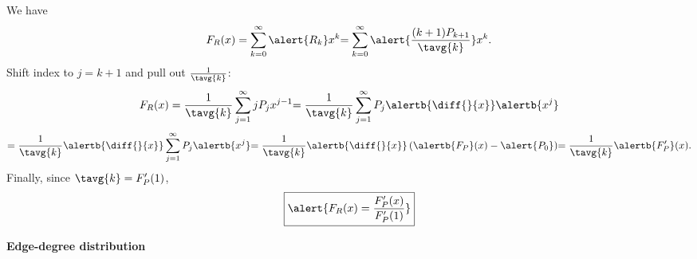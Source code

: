 \begin{frame}[label=]
\begin{frame}[label=]
\begin{frame}[label=]
\begin{frame}[label=]
\begin{frame}[label=]
\begin{frame}[label=]
\begin{frame}[label=]
    We have 
    $$
    F_R(x)
    =
    \sum_{k=0}^{\infty}
    \alert{R_k}
    x^k
    {
      =
      \sum_{k=0}^{\infty}
      \alert{
      \frac{(k+1)P_{k+1}}
      {\tavg{k}}
      }
      x^k.
    }
    $$
    {
      Shift index to $j=k+1$ and pull out $\frac{1}{\tavg{k}}$:
    }
    $$
    {
      F_R(x)
      =
      \frac{1}{\tavg{k}}
      \sum_{j=1}^{\infty}
      j P_{j} x^{j-1}
    }
    {
      =
      \frac{1}{\tavg{k}}
      \sum_{j=1}^{\infty}
      P_{j} 
      \alertb{\diff{}{x}}
      \alertb{x^{j}}
    }
    $$
    $$
    {
      = 
    \frac{1}{\tavg{k}}
    \alertb{\diff{}{x}}
    \sum_{j=1}^{\infty}
    P_{j} \alertb{x^{j}}
    }
    {
      = 
    \frac{1}{\tavg{k}}
    \alertb{\diff{}{x}}
    \left(
    \alertb{F_P}(x) - \alert{P_0}
    \right)
      }
    {
      = 
    \frac{1}{\tavg{k}}
    \alertb{F'_P}(x).
      }
    $$
    {
    Finally, since $\tavg{k} = F'_P(1)$,
    $$
    \boxed{
      \alert{
        F_R(x) = \frac{F'_P(x)}{F'_P(1)}
      }
    }
    $$
    }
  



\begin{frame}[label=]
  \textbf{Edge-degree distribution}


\end{frame}
\end{frame}
\end{frame}
\end{frame}
\end{frame}
\end{frame}
\end{frame}
\end{frame}
